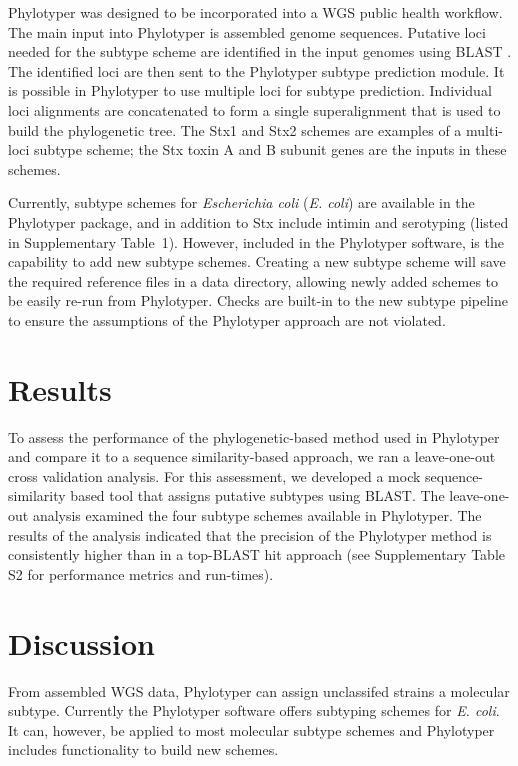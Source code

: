 \documentclass{bioinfo}
\begin{document}
Phylotyper was designed to be incorporated into a WGS public health workflow.  
The main input into Phylotyper is assembled genome sequences.  
Putative loci needed for the subtype scheme are identified in the input genomes using BLAST \citep{Camacho2009}.
The identified loci are then sent to the Phylotyper subtype prediction module.
It is possible in Phylotyper to use multiple loci for subtype prediction.
Individual loci alignments are concatenated to form a single superalignment that is used to build the phylogenetic tree.  
The Stx1 and Stx2 schemes are examples of a multi-loci subtype scheme; the Stx toxin A and B subunit genes are the inputs in these schemes.

Currently, subtype schemes for \emph{Escherichia coli} (\textit{E. coli}) are available in the Phylotyper package, and in addition to Stx include intimin and serotyping  (listed in Supplementary Table~1).
However, included in the Phylotyper software, is the capability to add new subtype schemes. 
Creating a new subtype scheme will save the required reference files in a data directory, allowing newly added schemes to be easily re-run from Phylotyper.
Checks are built-in to the new subtype pipeline to ensure the assumptions of the Phylotyper approach are not violated.  

\section{Results}

To assess the performance of the phylogenetic-based method used in Phylotyper and compare it to a sequence similarity-based approach, we ran a leave-one-out cross validation analysis.
For this assessment, we developed a mock sequence-similarity based tool that assigns putative subtypes using BLAST.
The leave-one-out analysis examined the four subtype schemes available in Phylotyper. The results of the analysis indicated that the precision of the Phylotyper method is consistently higher than in a top-BLAST hit approach (see Supplementary Table S2 for performance metrics and run-times).

\section{Discussion}

From assembled WGS data, Phylotyper can assign unclassifed strains a molecular subtype.
Currently the Phylotyper software offers subtyping schemes for \textit{E. coli}.
It can, however, be applied to most molecular subtype schemes and Phylotyper includes functionality to build new schemes.
\end{document}
